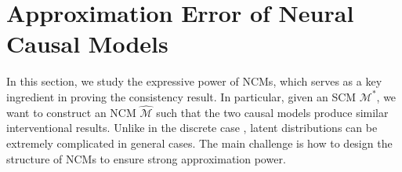 \documentclass[12pt]{article}
\theoremstyle{plain}
\theoremstyle{definition}
\theoremstyle{remark}
\begin{document}

\section{Approximation Error of Neural Causal Models}\label{sec:partial_identification}
In this section, we study the expressive power of NCMs, which serves as a key ingredient in proving the consistency result. In particular, given an SCM $ \mathcal{M}^*$, we want to construct an NCM $ \hat{\mathcal{M}}$ such that the two causal models produce similar interventional results. Unlike in the discrete case \cite{balkeCounterfactualProbabilitiesComputational1994,xiaCausalNeuralConnectionExpressiveness2022}, latent distributions can be extremely complicated in general cases. The main challenge is how to design the structure of NCMs to ensure strong approximation power. 
\end{document}
